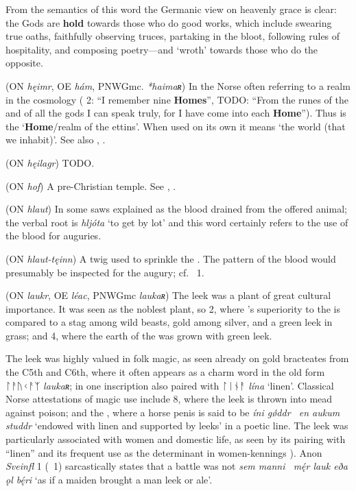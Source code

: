 \begin{itemize}
  From the semantics of this word the Germanic view on heavenly grace is clear: the Gods are \textbf{hold} towards those who do good works, which include swearing true oaths, faithfully observing truces, partaking in the bloot, following rules of hospitality, and composing poetry---and  ‘wroth’ towards those who do the opposite.

 (ON \emph{hęimr}, OE \emph{hám}, PNWGmc. \emph{*haimaʀ})
  In the Norse often referring to a realm in the cosmology ( 2: “I remember nine \textbf{Homes}”,  TODO: “From the runes of the  and of all the gods I can speak truly, for I have come into each \textbf{Home}”). Thus  is the ‘\textbf{Home}/realm of the ettins’. When used on its own it means ‘the world (that we inhabit)’. See also , .

 (ON \emph{hęilagr})
  TODO.

 (ON \emph{hof})
  A pre-Christian temple.  See , .

 (ON \emph{hlaut})
  In some saws explained as the blood drained from the offered animal; the verbal root is \emph{hljóta} ‘to get by lot’ and this word certainly refers to the use of the blood for auguries.

 (ON \emph{hlaut-tęinn})
  A twig used to sprinkle the .  The pattern of the blood would presumably be inspected for the augury; cf.~ 1.

 (ON \emph{laukr}, OE \emph{léac}, PNWGmc \emph{laukaʀ})
  The leek was a plant of great cultural importance.  It was seen as the noblest plant, so  2, where ’s superiority to the  is compared to a stag among wild beasts, gold among silver, and a green leek in grass; and  4, where the earth of the  was grown with green leek.

  The leek was highly valued in folk magic, as seen already on gold bracteates from the C5th and C6th, where it often appears as a charm word in the old form {ᛚᚨᚢᚲᚨᛉ} \emph{laukaʀ}; in one inscription also paired with {ᛚᛁᚾᚨ} \emph{lína} ‘linen’.  Classical Norse attestations of magic use include  8, where the leek is thrown into mead against poison; and the \Volsathattr, where a horse penis is said to be \emph{íni gǿddr \hld\ en aukum studdr} ‘endowed with linen and supported by leeks’ in a poetic line.  The leek was particularly associated with women and domestic life, as seen by its pairing with “linen” and its frequent use as the determinant in women-kennings \parencite[418]{Meissner1921}).  Anon \emph{Sveinfl} 1 (\Skp\ 1) sarcastically states that a battle was not \emph{sem manni \hld\ mę́r lauk eða ǫl bę́ri} ‘as if a maiden brought a man leek or ale’.%


\end{itemize}

